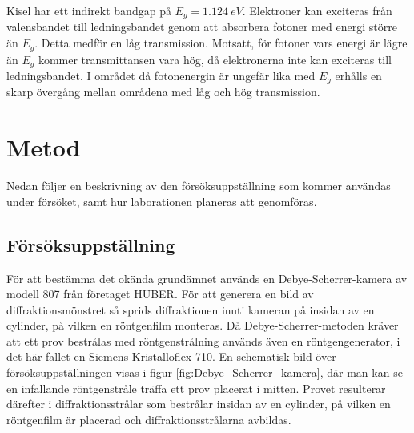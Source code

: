 \documentclass[12pt, a4paper]{article}
\begin{document}
Kisel har ett indirekt bandgap på $E_g = \SI{1,124}{eV}$\cite{physics_handbook}. Elektroner kan exciteras från valensbandet till ledningsbandet genom att absorbera fotoner med energi större än $E_g$. Detta medför en låg transmission. Motsatt, för fotoner vars energi är lägre än $E_g$ kommer transmittansen vara hög, då  elektronerna inte kan exciteras till ledningsbandet. I området då fotonenergin är ungefär lika med $E_g$ erhålls en skarp övergång mellan områdena med låg och hög transmission.







\section{Metod}
Nedan följer en beskrivning av den försöksuppställning som kommer användas under försöket, samt hur laborationen planeras att genomföras.

\subsection{Försöksuppställning}
För att bestämma det okända grundämnet används en Debye-Scherrer-kamera av modell 807 från företaget HUBER. För att generera en bild av diffraktionsmönstret så sprids diffraktionen inuti kameran på insidan av en cylinder, på vilken en röntgenfilm monteras. Då Debye-Scherrer-metoden kräver att ett prov bestrålas med röntgenstrålning används även en röntgengenerator, i det här fallet en Siemens Kristalloflex 710. En schematisk bild över försöksuppställningen visas i figur \ref{fig:Debye_Scherrer_kamera}, där man kan se en infallande röntgenstråle träffa ett prov placerat i mitten. Provet resulterar därefter i diffraktionsstrålar som bestrålar insidan av en cylinder, på vilken en röntgenfilm är placerad och diffraktionsstrålarna avbildas.
\end{document}

